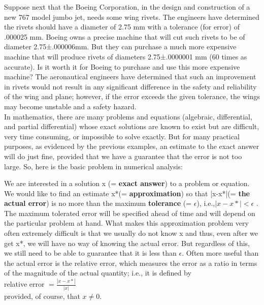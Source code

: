 \documentclass[../main.tex]{subfiles}
\begin{document}
Suppose next that the Boeing Corporation, in the design and construction of a 
new 767 model jumbo jet, needs some wing rivets. The engineers have determined 
the rivets should have a diameter of 2.75 mm with a tolerance (for error) of 
.000025 mm. Boeing owns a precise machine that will cut such rivets to be of 
diameter 2.75±.000006mm. But they can purchase a much more expensive 
machine that will produce rivets of diameters 2.75±.0000001 mm (60 times as 
accurate). Is it worth it for Boeing to purchase and use this more expensive 
machine? The aeronautical engineers have determined that such an improvement 
in rivets would not result in any significant difference in the safety and reliability 
of the wing and plane; however, if the error exceeds the given tolerance, the wings 
may become unstable and a safety hazard.\\

In mathematics, there are many problems and equations (algebraic, differential, 
and partial differential) whose exact solutions are known to exist but are difficult, 
very time consuming, or impossible to solve exactly. But for many practical 
purposes, as evidenced by the previous examples, an estimate to the exact answer 
will do just fine, provided that we have a guarantee that the error is not too large. 
So, here is the basic problem in numerical analysis:

We are interested in a solution x (= \textbf{exact answer}) to a problem or equation.
We would like to find an estimate x*(=\textbf{ approximation}) so that |x-x*|(= \textbf{the actual error}) is no more than the 
maximum \textbf{tolerance} (= $\epsilon$), i.e.,$ |x-x*| < \epsilon$ . The maximum tolerated error will be 
specified ahead of time and will depend on the particular problem at hand. What 
makes this approximation problem very often extremely difficult is that we usually 
do not know x and thus, even after we get x*, we will have no way of knowing 
the actual error. But regardless of this, we still need to be able to guarantee that it 
is less than $\epsilon$. Often more useful than the actual error is the relative error, which 
measures the error as a ratio in terms of the magnitude of the actual quantity; i.e., it 
is defined by\\

relative error $=\frac{|x-x*|}{|x|}$\\

provided, of course, that $x \neq 0$.\\
\end{document}
